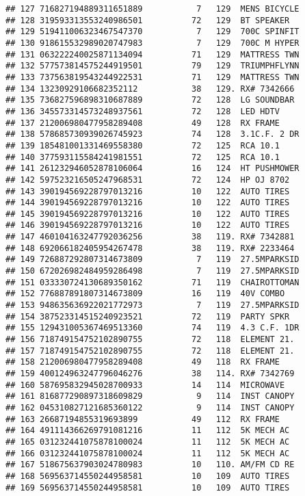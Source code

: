 \documentclass[]{article}
\begin{document}
\begin{verbatim}
## 127 716827194889311651889           7   129  MENS BICYCLE
## 128 319593313553240986501          72   129  BT SPEAKER  
## 129 519411006323467547370           7   129  700C SPINFIT
## 130 918615532989020747983           7   129  700C M HYPER
## 131 063222240025871134094          71   129  MATTRESS TWN
## 132 577573814575244919501          79   129  TRIUMPHFLYNN
## 133 737563819543244922531          71   129  MATTRESS TWN
## 134 13230929106682352112           38   129. RX# 7342666 
## 135 736827596898310687889          72   128  LG SOUNDBAR 
## 136 345573314573248937561          72   128  LED HDTV    
## 137 212006980477958289408          49   128  RX FRAME    
## 138 578685730939026745923          74   128  3.1C.F. 2 DR
## 139 185481001331469558380          72   125  RCA 10.1    
## 140 377593115584241981551          72   125  RCA 10.1    
## 141 261232946052878106064          16   124  HT PUSHMOWER
## 142 597523216505247968531          72   124  HP OJ 8702  
## 143 390194569228797013216          10   122  AUTO TIRES  
## 144 390194569228797013216          10   122  AUTO TIRES  
## 145 390194569228797013216          10   122  AUTO TIRES  
## 146 390194569228797013216          10   122  AUTO TIRES  
## 147 460104163247792036256          38   119. RX# 7342881 
## 148 692066182405954267478          38   119. RX# 2233464 
## 149 726887292807314673809           7   119  27.5MPARKSID
## 150 672026982484959286498           7   119  27.5MPARKSID
## 151 033330724130689350162          71   119  CHAIROTTOMAN
## 152 776887891807314673809          16   119  40V COMBO   
## 153 948635636922021772973           7   119  27.5MPARKSID
## 154 387523314515240923521          72   119  PARTY SPKR  
## 155 129431005367469513360          74   119  4.3 C.F. 1DR
## 156 718749154752102890755          72   118  ELEMENT 21. 
## 157 718749154752102890755          72   118  ELEMENT 21. 
## 158 212006980477958289408          49   118  RX FRAME    
## 159 400124963247796046276          38   114. RX# 7342769 
## 160 587695832945028700933          14   114  MICROWAVE   
## 161 816877290897318609829           9   114  INST CANOPY 
## 162 045310827121685360122           9   114  INST CANOPY 
## 163 26687194855319693899           49   112  RX FRAME    
## 164 491114366269791081216          11   112  5K MECH AC  
## 165 031232441075878100024          11   112  5K MECH AC  
## 166 031232441075878100024          11   112  5K MECH AC  
## 167 518675637903024780983          10   110. AM/FM CD RE 
## 168 569563714550244958581          10   109  AUTO TIRES  
## 169 569563714550244958581          10   109  AUTO TIRES  

\end{verbatim}
\end{document}
